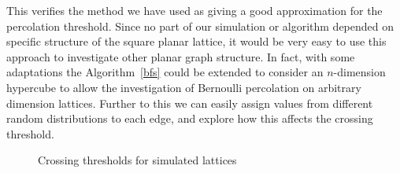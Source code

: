 \documentclass[a4paper,11pt]{article}
\theoremstyle{definition}
\begin{document}
This verifies the method we have used as giving a good approximation for the percolation threshold. Since no part of our simulation or algorithm depended on specific structure of the square planar lattice, it would be very easy to use this approach to investigate other planar graph structure. In fact, with some adaptations the Algorithm~\ref*{bfs} could be extended to consider an $n$-dimension hypercube to allow the investigation of Bernoulli percolation on arbitrary dimension lattices. Further to this we can easily assign values from different random distributions to each edge, and explore how this affects the crossing threshold.



\begin{landscape}
\begin{figure}
	\centering
	\caption{Crossing thresholds for simulated lattices}
	\label{fig:thresholdplot2}
\end{figure}
\end{landscape}
\end{document}
